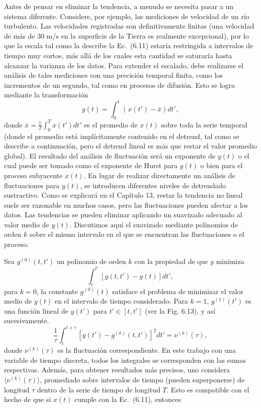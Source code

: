 \documentclass[10pt,a4paper]{book}
\begin{document}
Antes de pensar en eliminar la tendencia, a menudo se necesita pasar a un sistema diferente. Considere, por ejemplo, las mediciones de velocidad de un río turbulento. Las velocidades registradas son definitivamente finitas (una velocidad de más de 30 m/s en la superficie de la Tierra es realmente excepcional), por lo que la escala tal como la describe la Ec.~(6.11) estaría restringida a intervalos de tiempo muy cortos, más allá de los cuales esta cantidad se saturaría hasta alcanzar la varianza de los datos. Para extender el escalado, debe realizarse el análisis de tales mediciones con una precisión temporal finita, como los incrementos de un segundo, tal como en procesos de difusión. Esto se logra mediante la transformación
\begin{equation}
y(t) = \int_{0}^{t} (x(t') - \bar{x}) dt',
\end{equation}
donde \(\bar{x} = \frac{1}{T} \int_0^T x(t') dt'\) es el promedio de \(x(t)\) sobre toda la serie temporal (donde el promedio está implícitamente contenido en el detrend, tal como se describe a continuación, pero el detrend lineal es más que restar el valor promedio global). El resultado del análisis de fluctuación será un exponente de \(y(t)\) o el cual puede ser tomado como el exponente de Hurst para \(y(t)\) o bien para el proceso subyacente \(x(t)\). En lugar de realizar directamente un análisis de fluctuaciones para \(y(t)\), se introducen diferentes niveles de detrendado sustractivo. Como se explicará en el Capítulo 13, restar la tendencia no lineal suele ser razonable en muchos casos, pero las fluctuaciones pueden afectar a los datos. Las tendencias se pueden eliminar aplicando un suavizado adecuado al valor medio de \(y(t)\). Discutimos aquí el suavizado mediante polinomios de orden \(k\) sobre el mismo intervalo en el que se encuentran las fluctuaciones o el proceso.

\bigskip

Sea \( g^{(0)}(t, t') \) un polinomio de orden \( k \) con la propiedad de que \( g \) minimiza
\begin{equation}
\int_{t}^{t'} \left[ g(t,t') - y(t) \right] dt',
\end{equation}
para \( k = 0 \), la constante \( g^{(0)}(t) \) satisface el problema de minimizar el valor medio de \( y(t) \) en el intervalo de tiempo considerado. Para \( k = 1 \), \( g^{(1)}(t') \) es una función lineal de \( y(t') \) para \( t' \in [t, t'] \) (ver la Fig. 6.13), y así sucesivamente.
\begin{equation}
\frac{1}{\tau} \int_{t}^{t+\tau} \left[ y(t') - g^{(k)}(t,t') \right]^2 dt' = \nu^{(k)}(\tau),
\end{equation}
donde \( \nu^{(k)}(\tau) \) es la fluctuación correspondiente. En este trabajo con una variable de tiempo discreta, todos los integrales se corresponden con las sumas respectivas. Además, para obtener resultados más precisos, uno considera \( \langle \nu^{(k)}(\tau) \rangle \), promediado sobre intervalos de tiempo (pueden superponerse) de longitud \( \tau \) dentro de la serie de tiempo de longitud \( T \). Esto es compatible con el hecho de que si \( x(t) \) cumple con la Ec.~(6.11), entonces
\end{document}

